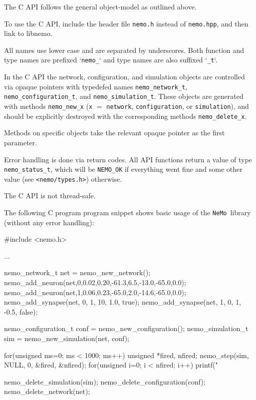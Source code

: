 \documentclass[a4paper]{article}
\newcommand{\nemo}{\texttt{NeMo}}
\newcommand{\code}[1]{\texttt{#1}}
\newcommand{\file}[1]{\texttt{#1}}
\begin{document}
The C API follows the general object-model as outlined above.

To use the C API, include the header file \file{nemo.h} instead of \file{nemo.hpp},
	and then link to libnemo.

All names use lower case and are separated by underscores. 
Both function and type names are prefixed `\code{nemo\_}`
	and type names are also suffixed `\code{\_t}`.

In the C API the network, configuration, and simulation objects are controlled via opaque pointers
	with typedefed names \code{nemo\_network\_t}, \code{nemo\_configuration\_t}, and \code{nemo\_simulation\_t}.
These objects are generated with methods 
	\code{nemo\_new\_x} (\code{x} $=$ \code{network}, \code{configuration}, or \code{simulation}),
	and should be explicitly destroyed with the corresponding methods 
	\code{nemo\_delete\_x}.

Methods on specific objects take the relevant opaque pointer as the first parameter.

Error handling is done via return codes.
All API functions return a value of type \code{nemo\_status\_t},
	which will be \code{NEMO\_OK} if everything went fine and some other value (see \file{<nemo/types.h>}) otherwise.

The C API is not thread-safe.

The following C program program snippet shows basic usage of the \nemo\ library (without any error
handling): 

\begin{ccode}
#include <nemo.h>

...

nemo_network_t net = nemo_new_network();
nemo_add_neuron(net,0,0.02,0.20,-61.3,6.5,-13.0,-65.0,0.0);
nemo_add_neuron(net,1,0.06,0.23,-65.0,2.0,-14.6,-65.0,0.0);
nemo_add_synapse(net, 0, 1, 10, 1.0, true);
nemo_add_synapse(net, 1, 0, 1, -0.5, false);

nemo_configuration_t conf = nemo_new_configuration();
nemo_simulation_t sim = nemo_new_simulation(net, conf);

for(unsigned ms=0; ms < 1000; ms++) {
	unsigned *fired, nfired;
	nemo_step(sim, NULL, 0, &fired, &nfired);
	for(unsigned i=0; i < nfired; i++) {
		printf("%
	}
}

nemo_delete_simulation(sim);	
nemo_delete_configuration(conf);
nemo_delete_network(net);
\end{ccode}

\newpage
\end{document}
